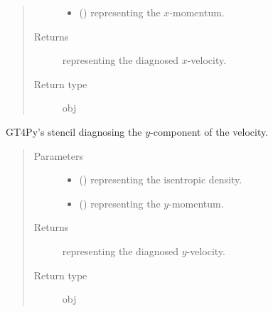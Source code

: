 \documentclass[letterpaper,10pt,english]{sphinxmanual}
\begin{document}
\begin{fulllineitems}
\begin{fulllineitems}
\begin{quote}
\begin{description}
\begin{itemize}
\item {} 
 () \textendash{}  representing the \(x\)-momentum.

\end{itemize}

\item[{Returns}] \leavevmode
{} representing the diagnosed \(x\)-velocity.

\item[{Return type}] \leavevmode
obj

\end{description}\end{quote}

\end{fulllineitems}


\begin{fulllineitems}
\label{\detokenize{api:dycore.diagnostic_isentropic.DiagnosticIsentropic._defs_stencil_diagnosing_velocity_y}}
GT4Py’s stencil diagnosing the \(y\)-component of the velocity.
\begin{quote}\begin{description}
\item[{Parameters}] \leavevmode\begin{itemize}
\item {} 
 () \textendash{}  representing the isentropic density.

\item {} 
 () \textendash{}  representing the \(y\)-momentum.

\end{itemize}

\item[{Returns}] \leavevmode
{} representing the diagnosed \(y\)-velocity.

\item[{Return type}] \leavevmode
obj

\end{description}\end{quote}


\end{fulllineitems}
\end{fulllineitems}
\end{document}
